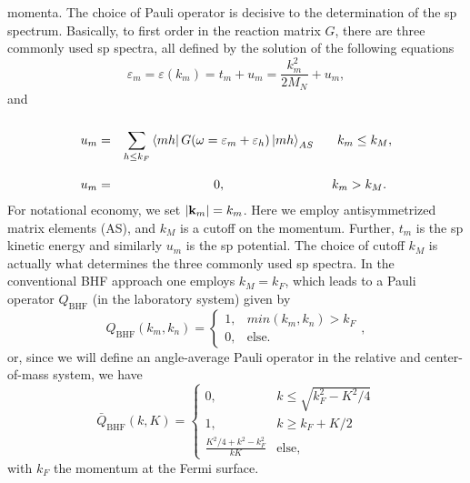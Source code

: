 \documentclass[%
oneside,                 %
final,                   %
10pt]{article}
\begin{document}
momenta.
The choice of Pauli operator is decisive to the determination of the
sp
spectrum. Basically, to first order in the reaction matrix $G$,
there are three commonly used sp spectra, all
defined by the solution of the following equations
\begin{equation}
   \varepsilon_{m} = \varepsilon (k_{m})
   = t_{m} + u_{m}=\frac{k_{m}^2}{2M_N}
   +u_{m},
   \label{eq:spnrel}
\end{equation}
and
\begin{equation}
   \begin{array}{ccc}\\
   u_{m} =& {\displaystyle \sum_{h \leq k_F}}
   \left\langle m h \right| G(\omega = \varepsilon_{m} + \varepsilon_h )
   \left| m h \right\rangle_{AS} & \hspace{3mm}k_m \leq k_M,  \\ \\
   u_m=&0,& k_m > k_M. \end{array}
   \label{eq:selfcon}
\end{equation}
For notational economy, we set $|{\bf k}_m|=k_m$.
Here we employ antisymmetrized matrix elements (AS), and $k_M$ is a cutoff
on the momentum. Further, $t_m$ is the sp kinetic
energy and similarly $u_m$
is the
sp potential.
The choice of cutoff $k_M$ is actually what determines the three
commonly used sp spectra.
In the conventional BHF approach one employs $k_M = k_F$,
which leads
to a Pauli operator $Q_{\mathrm{BHF}}$ (in the laboratory system) given by
\begin{equation}
   Q_{\mathrm{BHF}}(k_m , k_n ) =
    \left\{\begin{array}{cc}1,&min(k_m ,k_n ) > k_F\\
    0,&\mathrm{else}.\end{array}\right.
    \label{eq:bhf},
\end{equation}
or, since we will define an
angle-average Pauli operator in the relative and center-of-mass
system, we have
\begin{equation}
     \bar{Q}_{\mathrm{BHF}}(k,K)=\left\{\begin{array}{cc}
         0,&k\leq \sqrt{k_{F}^{2}-K^2/4}\\
         1,&k\geq k_F + K/2\\
	\frac{K^2/4+k^2 -k_{F}^2}{kK}&\mathrm{else},\end{array}\right.
    \label{eq:qbhf}
\end{equation}
with $k_F$ the momentum at the Fermi surface.
\end{document}
